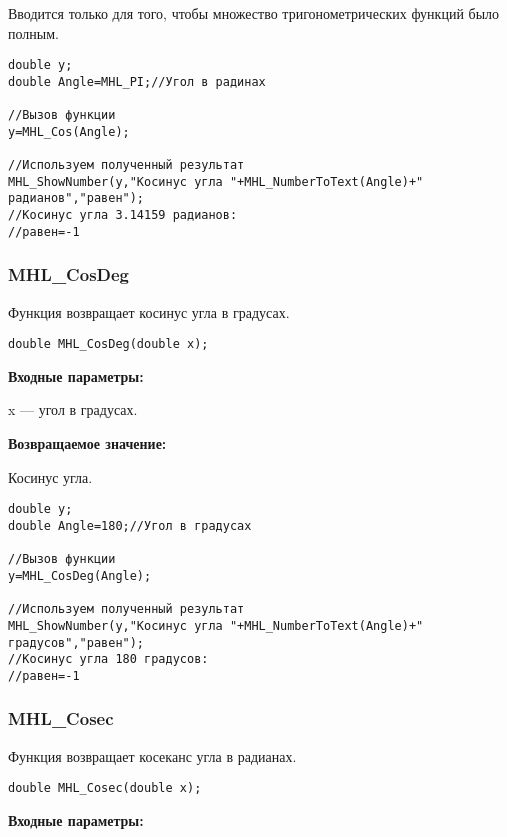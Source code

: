 \documentclass[a4paper,12pt]{article}
\begin{document}
Вводится только для того, чтобы множество тригонометрических функций было полным.


\begin{lstlisting}[label=code_use_MHL_Cos,caption=Пример использования]
double y;
double Angle=MHL_PI;//Угол в радинах

//Вызов функции
y=MHL_Cos(Angle);

//Используем полученный результат
MHL_ShowNumber(y,"Косинус угла "+MHL_NumberToText(Angle)+" радианов","равен");
//Косинус угла 3.14159 радианов:
//равен=-1
\end{lstlisting}

\subsubsection{MHL\_CosDeg}\label{MHL_CosDeg}

Функция возвращает косинус угла в градусах.


\begin{lstlisting}[label=code_syntax_MHL_CosDeg,caption=Синтаксис]
double MHL_CosDeg(double x);
\end{lstlisting}

\textbf{Входные параметры:}

 x --- угол в градусах.

\textbf{Возвращаемое значение:}

Косинус угла.


\begin{lstlisting}[label=code_use_MHL_CosDeg,caption=Пример использования]
double y;
double Angle=180;//Угол в градусах

//Вызов функции
y=MHL_CosDeg(Angle);

//Используем полученный результат
MHL_ShowNumber(y,"Косинус угла "+MHL_NumberToText(Angle)+" градусов","равен");
//Косинус угла 180 градусов:
//равен=-1
\end{lstlisting}

\subsubsection{MHL\_Cosec}\label{MHL_Cosec}

Функция возвращает косеканс угла в радианах.


\begin{lstlisting}[label=code_syntax_MHL_Cosec,caption=Синтаксис]
double MHL_Cosec(double x);
\end{lstlisting}

\textbf{Входные параметры:}
\end{document}
